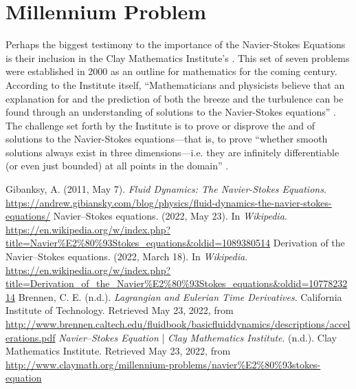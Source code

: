 \documentclass[12pt]{article}
\begin{document}
    \section{Millennium Problem}
    Perhaps the biggest testimony to the importance of the Navier-Stokes Equations is their inclusion in the Clay Mathematics Institute's . This set of seven problems were established in 2000 as an outline for mathematics for the coming century. According to the Institute itself, ``Mathematicians and physicists believe that an explanation for and the prediction of both the breeze and the turbulence can be found through an understanding of solutions to the Navier-Stokes equations'' \cite{clay}. The challenge set forth by the Institute is to prove or disprove the  and  of solutions to the Navier-Stokes equations---that is, to prove ``whether smooth solutions always exist in three dimensions---i.e. they are infinitely differentiable (or even just bounded) at all points in the domain'' \cite{wiki}.
    \begin{thebibliography}{5}
         Gibanksy, A. (2011, May 7). \emph{Fluid Dynamics: The Navier-Stokes Equations}. \url{https://andrew.gibiansky.com/blog/physics/fluid-dynamics-the-navier-stokes-equations/}
         Navier–Stokes equations. (2022, May 23). In \emph{Wikipedia}. \url{https://en.wikipedia.org/w/index.php?title=Navier%E2%80%93Stokes_equations&oldid=1089380514}
         Derivation of the Navier–Stokes equations. (2022, March 18). In \emph{Wikipedia}. \url{https://en.wikipedia.org/w/index.php?title=Derivation_of_the_Navier%E2%80%93Stokes_equations&oldid=1077823214}
             Brennen, C. E. (n.d.). \emph{Lagrangian and Eulerian Time Derivatives}. California Institute of Technology. Retrieved May 23, 2022, from \url{http://www.brennen.caltech.edu/fluidbook/basicfluiddynamics/descriptions/accelerations.pdf}
             \emph{Navier–Stokes Equation} | \emph{Clay Mathematics Institute}. (n.d.). Clay Mathematics Institute. Retrieved May 23, 2022, from \url{http://www.claymath.org/millennium-problems/navier%E2%80%93stokes-equation}
    \end{thebibliography}
\end{document}
